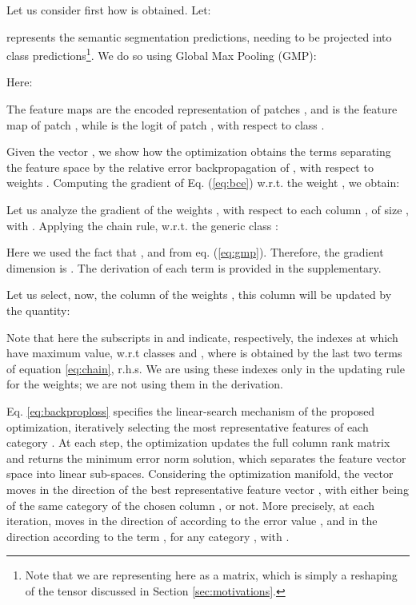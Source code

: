 \documentclass[runningheads]{styles/llncs}
\begin{document}
Let us consider first how   is obtained.  Let:

 represents the semantic segmentation predictions, needing to be projected into class predictions\footnote{Note that we are representing here  as a matrix, which is simply a reshaping of the tensor  discussed in Section \ref{sec:motivations}.}. We do so using Global Max Pooling (GMP):

Here:
 
The feature maps   are the encoded representation of patches , and  is the feature map of patch , while   is the logit of patch ,  with respect to class . 

Given the vector , we show how the optimization obtains the terms separating the feature space by the relative error backpropagation of , with respect to weights . Computing the gradient of Eq. (\ref{eq:bce}) w.r.t. the weight , we obtain:

Let us analyze the gradient of the weights , with respect to each column , of size , with .  Applying the chain rule, w.r.t. the generic class :


Here we used the fact that , and   from eq. (\ref{eq:gmp}). Therefore,  the gradient dimension is . 
The derivation of each term is provided in the supplementary.



Let   us select, now,  the column  of the weights , this column will be updated by the quantity:

Note that here the subscripts  in  and  indicate, respectively, the indexes at which   have maximum value, w.r.t classes  and , where  is obtained by the last two terms of equation \ref{eq:chain}, r.h.s.  We are using these indexes only in the updating rule for the weights; we are not using them in the derivation.

Eq. \ref{eq:backproploss} specifies the linear-search mechanism of the proposed optimization, iteratively selecting the most representative features  of each category . At each step, the optimization  updates the full column rank matrix  and returns the minimum error norm solution, which  separates the feature vector space  into  linear sub-spaces. 
Considering the optimization manifold,   the vector   moves  in the direction of the best representative feature vector , with either  being of the same category of the chosen column , or not. More precisely, at each iteration,  moves in the direction of   according to the error value , and in the direction  according to the term , for any category , with .
\end{document}
